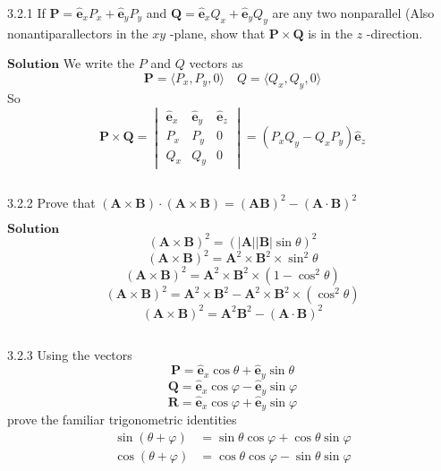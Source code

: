 



\begin{mybox}{3.2.1}
If $\mathbf{P}=\hat{\mathbf{e}}_{x} P_{x}+\hat{\mathbf{e}}_{y} P_{y}$ and $\mathbf{Q}=\hat{\mathbf{e}}_{x} Q_{x}+\hat{\mathbf{e}}_{y} Q_{y}$ are any two nonparallel (Also nonantiparallectors in the $x y$ -plane, show that $\mathbf{P} \times \mathbf{Q}$ is in the $z$ -direction.
\end{mybox}

$\boxed{\textbf{Solution}}$ We write the $P$ and $Q$ vectors as
$$\mathbf{P} = \langle P_x, P_y,0\rangle \quad Q = \langle Q_x, Q_y,0\rangle$$
So
$$\mathbf{P} \times \mathbf{Q} = \begin{vmatrix}
\hat{\mathbf{e}}_{x} & \hat{\mathbf{e}}_{y} & \hat{\mathbf{e}}_{z}\\ 
P_{x} & P_{y} & 0\\ 
Q_{x} & Q_{y} & 0
\end{vmatrix} =  (P_{x} Q_{y} - Q_{x} P_{y})\hat{\mathbf{e}}_{z}$$

$$$$


\begin{mybox}{3.2.2}
Prove that $(\mathbf{A} \times \mathbf{B}) \cdot(\mathbf{A} \times \mathbf{B})=(\mathbf{A} \mathbf{B})^{2}-(\mathbf{A} \cdot \mathbf{B})^{2}$
\end{mybox}


$\boxed{\textbf{Solution}}$
$$(\mathbf{A} \times \mathbf{B})^{2}=(|\mathbf{A}||\mathbf{B}| \sin \theta)^{2}$$
$$(\mathbf{A} \times \mathbf{B})^{2}=\mathbf{A}^{2} \times \mathbf{B}^{2} \times \sin ^{2} \theta$$
$$(\mathbf{A} \times \mathbf{B})^{2}=\mathbf{A}^{2} \times \mathbf{B}^{2} \times\left(1-\cos ^{2} \theta\right)$$
$$(\mathbf{A} \times \mathbf{B})^{2}=\mathbf{A}^{2} \times \mathbf{B}^{2}-\mathbf{A}^{2} \times \mathbf{B}^{2} \times\left(\cos ^{2} \theta\right)$$
$$(\mathbf{A} \times \mathbf{B})^{2}=\mathbf{A}^{2} \mathbf{B}^{2}-(\mathbf{A} \cdot \mathbf{B})^{2}$$

$$$$

\begin{mybox}{3.2.3}
Using the vectors
$$\mathbf{P}=\hat{\mathbf{e}}_{x} \cos \theta+\hat{\mathbf{e}}_{y} \sin \theta$$
$$\mathbf{Q}=\hat{\mathbf{e}}_{x} \cos \varphi-\hat{\mathbf{e}}_{y} \sin \varphi$$
$$\mathbf{R}=\hat{\mathbf{e}}_{x} \cos \varphi+\hat{\mathbf{e}}_{y} \sin \varphi$$
prove the familiar trigonometric identities
$$
\begin{aligned} \sin (\theta+\varphi) &=\sin \theta \cos \varphi+\cos \theta \sin \varphi \\ \cos (\theta+\varphi) &=\cos \theta \cos \varphi-\sin \theta \sin \varphi \end{aligned}
$$
\end{mybox}


